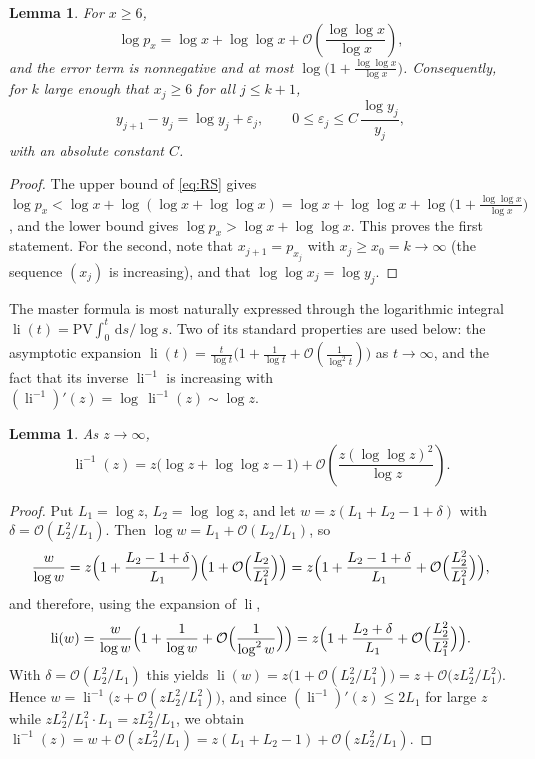 \documentclass[11pt,a4paper]{article}
\theoremstyle{plain}
\newtheorem{lemma}[theorem]{Lemma}
\theoremstyle{definition}
\newcommand{\li}{\operatorname{li}}
\newcommand{\dd}{\,\mathrm{d}}          %
\begin{document}
\begin{lemma}\label{lem:increment}
For $x\ge6$,
\[
  \log p_x=\log x+\log\log x+\mathcal{O}\!\left(\frac{\log\log x}{\log x}\right),
\]
and the error term is nonnegative and at most
$\log\!\bigl(1+\frac{\log\log x}{\log x}\bigr)$.
Consequently, for $k$ large enough that $x_j\ge6$ for all $j\le k+1$,
\begin{equation}\label{eq:step}
  y_{j+1}-y_j=\log y_j+\varepsilon_j,
  \qquad 0\le\varepsilon_j\le C\,\frac{\log y_j}{y_j},
\end{equation}
with an absolute constant $C$.
\end{lemma}

\begin{proof}
The upper bound of \eqref{eq:RS} gives
$\log p_x<\log x+\log(\log x+\log\log x)
=\log x+\log\log x+\log\bigl(1+\frac{\log\log x}{\log x}\bigr)$,
and the lower bound gives $\log p_x>\log x+\log\log x$. This proves the
first statement. For the second, note that $x_{j+1}=p_{x_j}$ with
$x_j\ge x_0=k\to\infty$ (the sequence $(x_j)$ is increasing), and that
$\log\log x_j=\log y_j$.
\end{proof}

The master formula is most naturally expressed through the logarithmic
integral $\li(t)=\mathrm{PV}\!\int_0^t \dd s/\log s$. Two of its standard
properties are used below: the asymptotic expansion
$\li(t)=\frac{t}{\log t}\bigl(1+\frac1{\log t}+
\mathcal{O}(\frac{1}{\log^2 t})\bigr)$ as $t\to\infty$, and the fact that
its inverse $\li^{-1}$ is increasing with
$(\li^{-1})'(z)=\log\,\li^{-1}(z)\sim\log z$.

\begin{lemma}\label{lem:inverse}
As $z\to\infty$,
\[
  \li^{-1}(z)=z\bigl(\log z+\log\log z-1\bigr)
  +\mathcal{O}\!\left(\frac{z(\log\log z)^2}{\log z}\right).
\]
\end{lemma}

\begin{proof}
Put $L_1=\log z$, $L_2=\log\log z$, and let
$w=z(L_1+L_2-1+\delta)$ with $\delta=\mathcal{O}(L_2^2/L_1)$. Then
$\log w=L_1+\mathcal{O}(L_2/L_1)$, so
\[
  \frac{w}{\log w}
  =z\Bigl(1+\frac{L_2-1+\delta}{L_1}\Bigr)
   \Bigl(1+\mathcal{O}\Bigl(\frac{L_2}{L_1^2}\Bigr)\Bigr)
  =z\Bigl(1+\frac{L_2-1+\delta}{L_1}
   +\mathcal{O}\Bigl(\frac{L_2^2}{L_1^2}\Bigr)\Bigr),
\]
and therefore, using the expansion of $\li$,
\[
  \li(w)=\frac{w}{\log w}\Bigl(1+\frac1{\log w}
   +\mathcal{O}\Bigl(\frac1{\log^2w}\Bigr)\Bigr)
  =z\Bigl(1+\frac{L_2+\delta}{L_1}
   +\mathcal{O}\Bigl(\frac{L_2^2}{L_1^2}\Bigr)\Bigr).
\]
With $\delta=\mathcal{O}(L_2^2/L_1)$ this yields
$\li(w)=z\bigl(1+\mathcal{O}(L_2^2/L_1^2)\bigr)
=z+\mathcal{O}\bigl(zL_2^2/L_1^2\bigr)$. Hence
$w=\li^{-1}\bigl(z+\mathcal{O}(zL_2^2/L_1^2)\bigr)$, and since
$(\li^{-1})'(z)\le 2L_1$ for large $z$ while
$zL_2^2/L_1^2\cdot L_1=zL_2^2/L_1$, we obtain
$\li^{-1}(z)=w+\mathcal{O}(zL_2^2/L_1)
=z(L_1+L_2-1)+\mathcal{O}(zL_2^2/L_1)$.
\end{proof}
\end{document}
